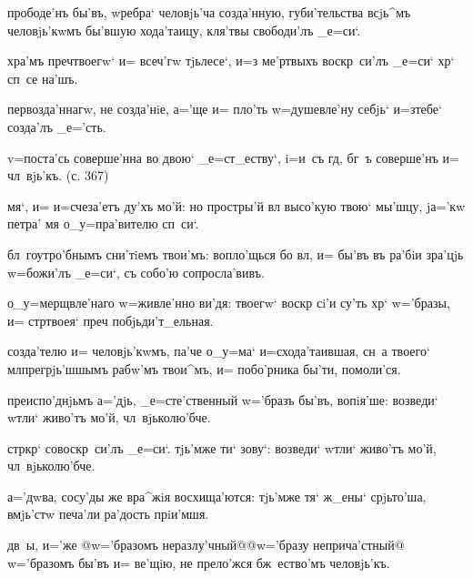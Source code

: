 прободе'нъ бы'въ, w\т ребра` человjь'ча созда'нную, 
губи'тельства всjь^мъ человjь'кwмъ бы'вшую хода'таицу, 
кля'твы свободи'лъ _е=си`.

хра'мъ преч твоегw` и= всеч'гw тjьлесе`, и=з\ъ 
ме'ртвыхъ воскр~си'лъ _е=си` хр` сп~се на'шъ.


первозда'ннагw, не созда'нiе, а='ще и= пло'ть 
w=душевле'ну себjь` и=з\ъ тебе` созда'лъ _е='сть.

v=поста'сь соверше'нна во двою` _е=ст_еству`, i=и~съ 
гд, бг~ъ соверше'нъ и= чл~вjь'къ. (с. 367)


мя`, и= и=счеза'етъ ду'хъ мо'й: но простры'й вл 
высо'кую твою` мы'шцу, jа='кw петра' мя о_у=пра'вителю 
сп~си`.

бл~гоутро'бнымъ сни'тiемъ твои'мъ: вопло'щься бо вл, 
и= бы'въ въ ра'бiи зра'цjь w=божи'лъ _е=си`, съ собо'ю 
сопросла'вивъ.

о_у=мерщвле'наго w=живле'нно ви'дя: твоегw` воскр 
сi'и су'ть хр` w='бразы, и= стр твоея` преч 
побjьди'т_ельная.

созда'телю и= человjь'кwмъ, па'че о_у=ма` 
и=схода'таившая, сн~а твоего` мл прегрjь'шшымъ 
рабw'мъ твои^мъ, и= побо'рника бы'ти, помоли'ся.


преиспо'днjьмъ а='дjь, _е=сте'ственный w='бразъ бы'въ, 
вопiя'ше: возведи` w\т тли` живо'тъ мо'й, чл~вjьколю'бче.

стр кр` совоскр~си'лъ _е=си`. тjь'мже ти` зову`: 
возведи` w\т тли` живо'тъ мо'й, чл~вjьколю'бче.

а='дwва, сосу'ды же вра^жiя восхища'ются: тjь'мже тя` 
ж_ены` срjьто'ша, вмjь'стw печа'ли ра'дость прiи'мшя.


дв~ы, и='же @w='бразомъ неразлу'чный@{@w='бразу 
неприча'стный@} w='бразомъ бы'въ и= ве'щiю, не прело'жся 
бж~ество'мъ человjь'къ.

